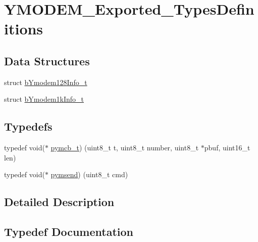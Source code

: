 \hypertarget{group___y_m_o_d_e_m___exported___types_definitions}{}\section{Y\+M\+O\+D\+E\+M\+\_\+\+Exported\+\_\+\+Types\+Definitions}
\label{group___y_m_o_d_e_m___exported___types_definitions}
\subsection*{Data Structures}
\begin{DoxyCompactItemize}
\item 
struct \mbox{\hyperlink{structb_ymodem128_info__t}{b\+Ymodem128\+Info\+\_\+t}}
\item 
struct \mbox{\hyperlink{structb_ymodem1k_info__t}{b\+Ymodem1k\+Info\+\_\+t}}
\end{DoxyCompactItemize}
\subsection*{Typedefs}
\begin{DoxyCompactItemize}
\item 
typedef void($\ast$ \mbox{\hyperlink{group___y_m_o_d_e_m___exported___types_definitions_gad74fcad348f660a999a9903fa1c5c1ac}{pymcb\+\_\+t}}) (uint8\+\_\+t t, uint8\+\_\+t number, uint8\+\_\+t $\ast$pbuf, uint16\+\_\+t len)
\item 
typedef void($\ast$ \mbox{\hyperlink{group___y_m_o_d_e_m___exported___types_definitions_ga2429c212fbcca5113135547532d6181b}{pymsend}}) (uint8\+\_\+t cmd)
\end{DoxyCompactItemize}


\subsection{Detailed Description}


\subsection{Typedef Documentation}
\mbox{\label{group___y_m_o_d_e_m___exported___types_definitions_gad74fcad348f660a999a9903fa1c5c1ac}} 
